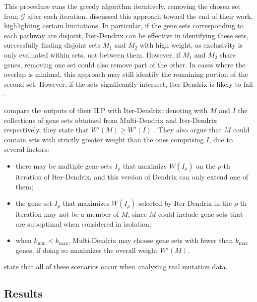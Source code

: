 This procedure runs the greedy algorithm iteratively, removing the chosen set from $\mathcal{G}$ after each iteration. \textcite{dendrix} discussed this approach toward the end of their work, highlighting certain limitations. In particular, if the gene sets corresponding to each pathway are disjoint, Iter-Dendrix can be effective in identifying these sets, successfully finding disjoint sets $M_1$ and $M_2$ with high weight, as exclusivity is only evaluated within sets, not between them. However, if $M_1$ and $M_2$ share genes, removing one set could also remove part of the other. In cases where the overlap is minimal, this approach may still identify the remaining portion of the second set. However, if the sets significantly intersect, Iter-Dendrix is likely to fail \cite{dendrix}.

\textcite{multi-dendrix} compare the outputs of their ILP with Iter-Dendrix: denoting with $M$ and $I$ the collections of gene sets obtained from Multi-Dendrix and Iter-Dendrix respectively, they state that $W'(M) \ge W'(I)$ . They also argue that $M$ could contain sets with strictly greater weight than the ones comprising $I$, due to several factors:

\begin{itemize}
    \item there may be multiple gene sets $I_\rho$ that maximize $W(I_\rho)$ on the $\rho$-th iteration of Iter-Dendrix, and this version of Dendrix can only extend one of them;
    \item the gene set $I_\rho$ that maximizes $W(I_\rho)$ selected by Iter-Dendrix in the $\rho$-th iteration may not be a member of $M$, since $M$ could include gene sets that are suboptimal when considered in isolation;
    \item when $k_\mathrm{min} < k_\mathrm{max}$, Multi-Dendrix may choose gene sets with fewer than $k_\mathrm{max}$ genes, if doing so maximizes the overall weight $W'(M)$.
\end{itemize}

\textcite{multi-dendrix} state that all of these scenarios occur when analyzing real mutation data.

\subsection{Results} \label{results_multi-dendrix}

